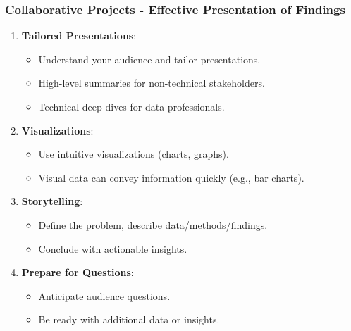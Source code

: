 \documentclass{beamer}
\begin{document}
\begin{frame}[fragile]
    \frametitle{Collaborative Projects - Effective Presentation of Findings}
    
    \begin{enumerate}
        \item \textbf{Tailored Presentations}:
        \begin{itemize}
            \item Understand your audience and tailor presentations.
            \item High-level summaries for non-technical stakeholders.
            \item Technical deep-dives for data professionals.
        \end{itemize}
        
        \item \textbf{Visualizations}:
        \begin{itemize}
            \item Use intuitive visualizations (charts, graphs).
            \item Visual data can convey information quickly (e.g., bar charts).
        \end{itemize}
        
        \item \textbf{Storytelling}:
        \begin{itemize}
            \item Define the problem, describe data/methods/findings.
            \item Conclude with actionable insights.
        \end{itemize}
        
        \item \textbf{Prepare for Questions}:
        \begin{itemize}
            \item Anticipate audience questions.
            \item Be ready with additional data or insights.
        \end{itemize}
    \end{enumerate}
\end{frame}
\end{document}
